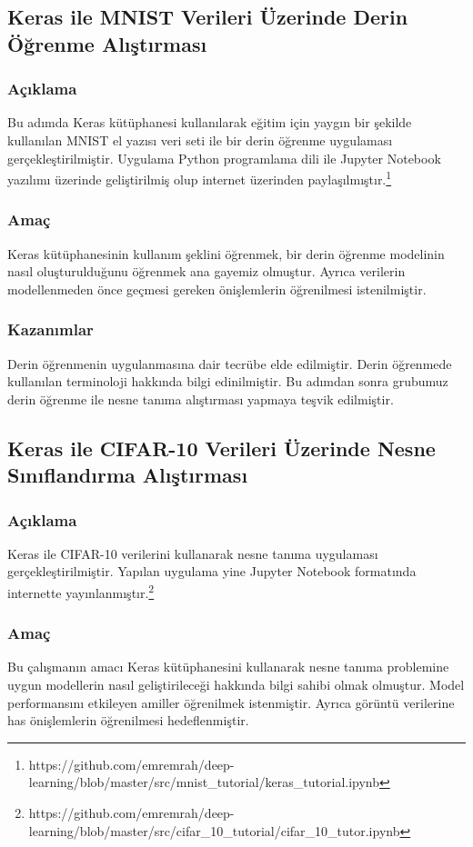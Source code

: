 \documentclass[12pt,a4paper]{article}
\begin{document}
    \subsection{Keras ile MNIST Verileri Üzerinde Derin Öğrenme Alıştırması}
    \subsubsection{Açıklama}
    Bu adımda Keras kütüphanesi kullanılarak eğitim için yaygın bir şekilde kullanılan MNIST el yazısı veri seti ile bir derin öğrenme uygulaması gerçekleştirilmiştir. 
    Uygulama Python programlama dili ile Jupyter Notebook yazılımı üzerinde geliştirilmiş olup internet üzerinden paylaşılmıştır.\footnote{https://github.com/emremrah/deep-learning/blob/master/src/mnist\_tutorial/keras\_tutorial.ipynb}
    \subsubsection{Amaç}
    Keras kütüphanesinin kullanım şeklini öğrenmek, bir derin öğrenme modelinin nasıl oluşturulduğunu öğrenmek ana gayemiz olmuştur. Ayrıca verilerin modellenmeden önce geçmesi gereken önişlemlerin
    öğrenilmesi istenilmiştir.

    \subsubsection{Kazanımlar}
    Derin öğrenmenin uygulanmasına dair tecrübe elde edilmiştir. Derin öğrenmede kullanılan terminoloji hakkında bilgi edinilmiştir. Bu adımdan sonra grubumuz derin öğrenme ile nesne tanıma alıştırması
    yapmaya teşvik edilmiştir.

    \subsection{Keras ile CIFAR-10 Verileri Üzerinde Nesne Sınıflandırma Alıştırması}
    \subsubsection{Açıklama}
    Keras ile CIFAR-10 verilerini kullanarak nesne tanıma uygulaması gerçekleştirilmiştir.
    Yapılan uygulama yine Jupyter Notebook formatında internette yayınlanmıştır.\footnote{https://github.com/emremrah/deep-learning/blob/master/src/cifar\_10\_tutorial/cifar\_10\_tutor.ipynb}

    \subsubsection{Amaç}
    Bu çalışmanın amacı Keras kütüphanesini kullanarak nesne tanıma problemine uygun modellerin nasıl geliştirileceği hakkında bilgi sahibi olmak olmuştur.
    Model performansını etkileyen amiller öğrenilmek istenmiştir. Ayrıca görüntü verilerine has önişlemlerin öğrenilmesi hedeflenmiştir.
\end{document}
